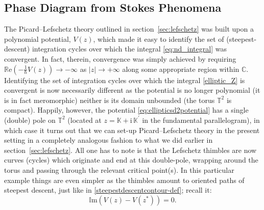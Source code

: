 \documentclass[11pt,a4paper]{article}
\def\BC{{\mathbb C}}
\def\BT{{\mathbb T}}
\def\BK{{\mathbb K}}
\newcommand{\be}{\begin{equation}}
\newcommand{\ee}{\end{equation}}
\def\im{{\mathbb{I}}{\mathrm{m}}}
\def\re{{\mathbb{R}}{\mathrm{e}}}
\newcommand{\rmi}{{\mathrm{i}}}
\begin{document}
\subsection{Phase Diagram from Stokes Phenomena}\label{sec:elliptic_thimbles}

The Picard--Lefschetz theory outlined in section~\ref{sec:lefschetz} was built upon a polynomial potential, $V(z)$, which made it easy to identify the set of (steepest-descent) integration cycles over which the integral \eqref{eq:nd_integral} was convergent. In fact, therein, convergence was simply achieved by requiring $\re \left( - \frac{1}{\hbar} V(z) \right) \rightarrow -\infty$ as $|z| \rightarrow +\infty$ along some appropriate region within $\BC$. Identifying the set of integration cycles over which the integral \eqref{elliptic_Z} is convergent is now necessarily different as the potential is no longer polynomial (it is in fact meromorphic) neither is its domain unbounded (the torus $\BT^2$ is compact). Happily, however, the potential \eqref{eq:ellipticsd2potential} has a single (double) pole on $\BT^2$ (located at $z=\BK+\rmi\, \BK^\prime$ in the fundamental parallelogram), in which case it turns out that we can set-up Picard--Lefschetz theory in the present setting in a completely analogous fashion to what we did earlier in section~\ref{sec:lefschetz}. All one has to note is that the Lefschetz thimbles are now curves (cycles) which originate and end at this double-pole, wrapping around the torus and passing through the relevant critical point(s). In this particular example things are even simpler as the thimbles amount to oriented paths of steepest descent, just like in \eqref{steepestdescentcontour-def}; recall it:
%
\be
\label{steepestdescentcontour-def-elliptic}
\im \left( V(z) - V(z^*) \right) = 0.
\ee
%
\noindent
\end{document}
